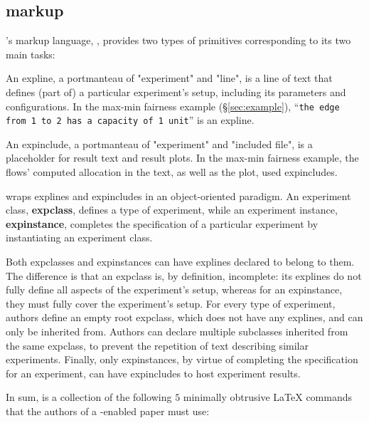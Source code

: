 
\subsection{\experimentex markup}
\label{sec:experimenttex}

\sysname's markup language, \experimentex, provides two types of primitives corresponding to its two main tasks:

 An expline, a portmanteau of "experiment" and "line", is a line of text that defines (part of) a particular experiment's setup, including its parameters and configurations. In the max-min fairness example (\S\ref{sec:example}), ``\texttt{the edge from 1 to 2 has a capacity of 1 unit}'' is an expline.

 An expinclude, a portmanteau of "experiment" and "included file", is a placeholder for result text and result plots. In the max-min fairness example, the flows' computed allocation in the text, as well as the plot, used expincludes.

\vspace{0.1in}
\noindent\experimentex wraps explines and expincludes in an object-oriented paradigm. An experiment class, \textbf{expclass}, defines a type of experiment, while an experiment instance, \textbf{expinstance}, completes the specification of a particular experiment by instantiating an experiment class.

Both expclasses and expinstances can have explines declared to belong to them. The difference is that an expclass is, by definition, incomplete: its explines do not fully define all aspects of the experiment's setup, whereas for an expinstance, they must fully cover the experiment's setup. For every type of experiment, authors define an empty root expclass, which does not have any explines, and can only be inherited from. Authors can declare multiple subclasses inherited from the same expclass, to prevent the repetition of text describing similar experiments. Finally, only expinstances, by virtue of completing the specification for an experiment, can have expincludes to host experiment results.

In sum, \experimentex is a collection of the following $5$ minimally obtrusive \LaTeX{} commands that the authors of a \sysname-enabled paper must use:

